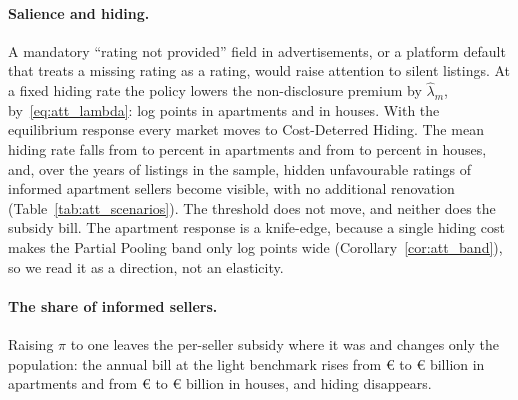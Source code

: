 \documentclass[10pt,letterpaper]{bp-template-concise}
\begin{document}
\paragraph{Salience and hiding.}
A mandatory ``rating not provided'' field in advertisements, or a platform default that treats a missing rating as a rating, would raise attention to silent listings. At a fixed hiding rate the policy lowers the non-disclosure premium by $\hat\lambda_m$, by~\eqref{eq:att_lambda}: \attSalienceApt{} log points in apartments and \attSalienceHouse{} in houses. With the equilibrium response every market moves to Cost-Deterred Hiding. The mean hiding rate falls from \attSigmaObsApt{} to \attSigmaFullApt{} percent in apartments and from \attSigmaObsHouse{} to \attSigmaFullHouse{} percent in houses, and, over the \attSampleYears{} years of listings in the sample, \attCfRevealedApt{} hidden unfavourable ratings of informed apartment sellers become visible, with no additional renovation (Table~\ref{tab:att_scenarios}). The threshold does not move, and neither does the subsidy bill. The apartment response is a knife-edge, because a single hiding cost makes the Partial Pooling band only \attBandWidthApt{} log points wide (Corollary~\ref{cor:att_band}), so we read it as a direction, not an elasticity.

\paragraph{The share of informed sellers.}
Raising $\pi$ to one leaves the per-seller subsidy where it was and changes only the population: the annual bill at the light benchmark rises from \euro{}\attScBaseCostTwoFiftyApt{} to \euro{}\attScPiOneCostTwoFiftyApt{} billion in apartments and from \euro{}\attScBaseCostTwoFiftyHouse{} to \euro{}\attScPiOneCostTwoFiftyHouse{} billion in houses, and hiding disappears.
\end{document}
